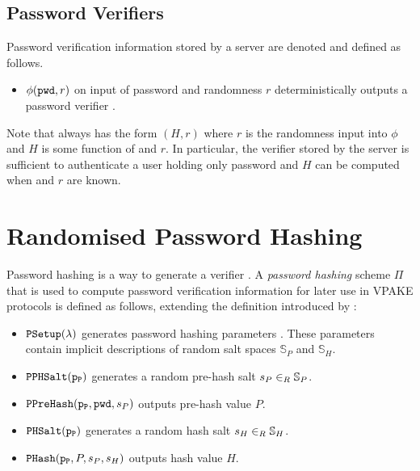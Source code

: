 \subsection{Password Verifiers}
Password verification information stored by a server are denoted \ver and defined as follows.
\begin{itemize}
  \item $\phi(\mathtt{pwd}, r)$ on input of password \pwd and randomness $r$ deterministically outputs a password verifier \ver.
\end{itemize}
Note that \ver always has the form $(H, r)$ where $r$ is the randomness input into $\phi$ and $H$ is some function of \pwd and $r$.
In particular, the verifier \ver stored by the server is sufficient to authenticate a user holding only password \pwd and $H$ can be computed when \pwd and $r$ are known.



\section{Randomised Password Hashing} \label{sec:strucphash}
Password hashing is a way to generate a verifier \ver.
A \emph{password hashing} scheme $\Pi$ that is used to compute password verification information \ver for later use in \ac{VPAKE} protocols is defined as follows, extending the definition introduced by \citet{BenhamoudaP13}:

\begin{itemize}
	\item $\mathtt{PSetup}(\lambda)$ generates password hashing parameters \paramP. 
	  These parameters contain implicit descriptions of random salt spaces $\mathbb{S}_P$ and $\mathbb{S}_H$.
	\item $\mathtt{PPHSalt}(\mathtt{p_P})$ generates a random pre-hash salt $s_P\in_R\mathbb{S}_P$.
	\item $\mathtt{PPreHash}(\mathtt{p_P}, \mathtt{pwd}, s_P)$ outputs pre-hash value $P$.
	\item $\mathtt{PHSalt}(\mathtt{p_P})$ generates a random hash salt $s_H\in_R\mathbb{S}_H$.
	\item $\mathtt{PHash}(\mathtt{p_P}, P, s_P, s_H)$ outputs hash value $H$.
\end{itemize}


